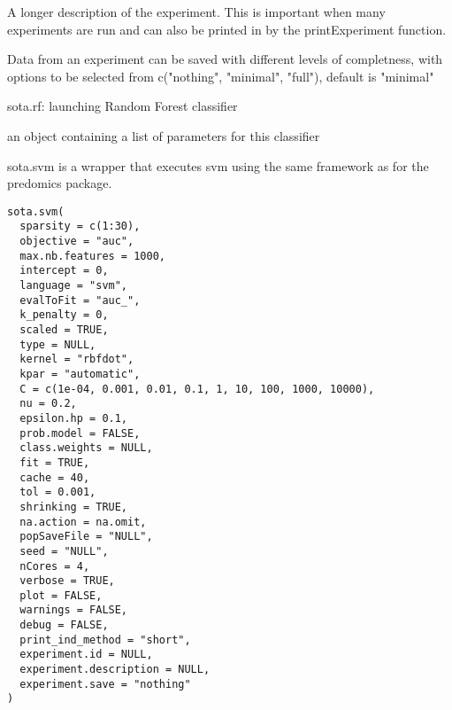 \documentclass[a4paper]{book}
\begin{document}
\begin{Arguments}
\begin{ldescription}
\item[\code{experiment.description:}] A longer description of the experiment. This is important when many experiments are run and can also be printed in by the printExperiment function.

\item[\code{experiment.save:}] Data from an experiment can be saved with different levels of completness, with options to be selected from c("nothing", "minimal", "full"), default is "minimal"
\end{ldescription}
\end{Arguments}
%
\begin{Details}
sota.rf: launching Random Forest classifier
\end{Details}
%
\begin{Value}
an object containing a list of parameters for this classifier
\end{Value}
%
\begin{Description}
sota.svm is a wrapper that executes svm using the same framework as for the predomics package.
\end{Description}
%
\begin{Usage}
\begin{verbatim}
sota.svm(
  sparsity = c(1:30),
  objective = "auc",
  max.nb.features = 1000,
  intercept = 0,
  language = "svm",
  evalToFit = "auc_",
  k_penalty = 0,
  scaled = TRUE,
  type = NULL,
  kernel = "rbfdot",
  kpar = "automatic",
  C = c(1e-04, 0.001, 0.01, 0.1, 1, 10, 100, 1000, 10000),
  nu = 0.2,
  epsilon.hp = 0.1,
  prob.model = FALSE,
  class.weights = NULL,
  fit = TRUE,
  cache = 40,
  tol = 0.001,
  shrinking = TRUE,
  na.action = na.omit,
  popSaveFile = "NULL",
  seed = "NULL",
  nCores = 4,
  verbose = TRUE,
  plot = FALSE,
  warnings = FALSE,
  debug = FALSE,
  print_ind_method = "short",
  experiment.id = NULL,
  experiment.description = NULL,
  experiment.save = "nothing"
)
\end{verbatim}
\end{Usage}
%
\end{document}
